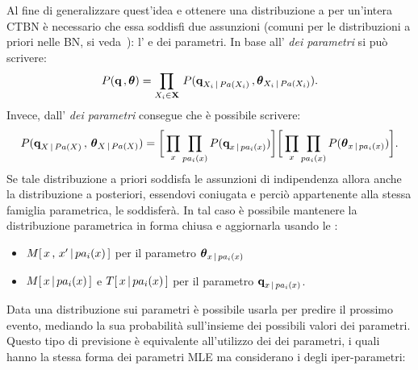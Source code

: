 Al fine di generalizzare quest'idea e ottenere una distribuzione a  per un'intera \acs{CTBN} è necessario che essa soddisfi due assunzioni (comuni per le distribuzioni a priori nelle \acl{BN}, si veda~\citet{Heckerman1996}): l' e  dei parametri. In base all'\emph{ dei parametri} si può scrivere:
\begin{equation}\label{eq:ctbn-bayesian-params-globalind}
P(\boldsymbol{\textbf{\text{q}}}\,,\boldsymbol{\textbf{\text{$\theta$}}})=\prod_{\mathnormal{X}_i\in\mathbf{X}}\,P(\boldsymbol{\textbf{\text{q}}}_{\mathnormal{X}_i\,\arrowvert\,Pa(\mathnormal{X}_i)}\,,\boldsymbol{\textbf{\text{$\theta$}}}_{\mathnormal{X}_i\,\arrowvert\,Pa(\mathnormal{X}_i)})\text{.}
\end{equation}
Invece, dall'\emph{ dei parametri} consegue che è possibile scrivere:
\footnotesize
\begin{equation}\label{eq:ctbn-bayesian-params-localind}
P(\boldsymbol{\textbf{\text{q}}}_{\mathnormal{X}\,\arrowvert\,Pa(\mathnormal{X})}\,,\,\boldsymbol{\textbf{\text{$\theta$}}}_{\mathnormal{X}\,\arrowvert\,Pa(\mathnormal{X})}) = \bigg[ \prod_{\mathnormal{x}}\prod_{pa_i(\mathnormal{x})} P(\boldsymbol{\textbf{\text{q}}}_{\mathnormal{x}\,\arrowvert\,pa_i(\mathnormal{x})}) \bigg] \bigg[ \prod_{\mathnormal{x}}\prod_{pa_i(\mathnormal{x})} P(\boldsymbol{\textbf{\text{$\theta$}}}_{\mathnormal{x}\,\arrowvert\,pa_i(\mathnormal{x})}) \bigg]\text{\normalsize .}
\end{equation}\normalsize
Se tale distribuzione a priori soddisfa le assunzioni di indipendenza allora anche la distribuzione a posteriori, essendovi coniugata e perciò appartenente alla stessa famiglia parametrica, le soddisferà. In tal caso è possibile mantenere la distribuzione parametrica in forma chiusa e aggiornarla usando le \emph{}:
\begin{itemize}
\item $\mstat[x]{\setel{x}^{\prime}\,\arrowvert\,pa_i(\setel{x})}$ per il parametro $\boldsymbol{\textbf{\text{$\theta$}}}_{\mathnormal{x}\,\arrowvert\,pa_i(\mathnormal{x})}$
\item $\mstat{x\,\arrowvert\,pa_i(\setel{x})}$ e $T[\,\mathnormal{x\,\arrowvert\,pa_i(\mathnormal{x})}\,]$ per il parametro $\boldsymbol{\textbf{\text{q}}}_{\mathnormal{x}\,\arrowvert\,pa_i(\mathnormal{x})}$.
\end{itemize}
Data una distribuzione sui parametri è possibile usarla per predire il prossimo evento, mediando la sua probabilità sull'insieme dei possibili valori dei parametri. Questo tipo di previsione è equivalente all'utilizzo dei \emph{} dei parametri, i quali hanno la stessa forma dei parametri \acl{MLE} ma considerano i \emph{} degli iper-parametri:
